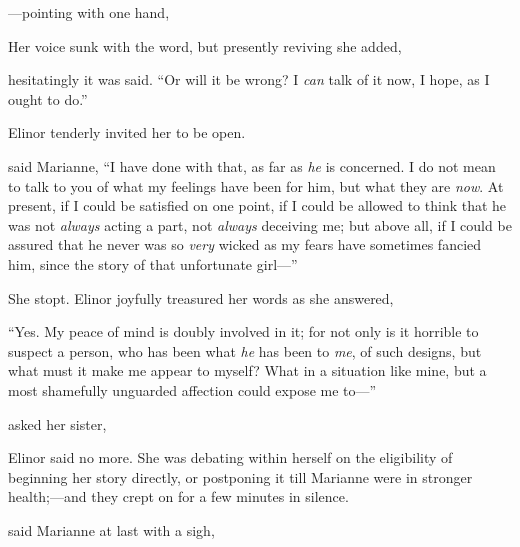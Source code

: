 ---pointing with one hand, 

Her voice sunk with the word, but presently reviving she added,

 hesitatingly it was said. “Or will it be wrong? I {\em can} talk of it now, I hope, as I ought to do.”

Elinor tenderly invited her to be open.

 said Marianne, “I have done with that, as far as {\em he} is concerned. I do not mean to talk to you of what my feelings have been for him, but what they are {\em now}. At present, if I could be satisfied on one point, if I could be allowed to think that he was not {\em always} acting a part, not {\em always} deceiving me; but above all, if I could be assured that he never was so {\em very} wicked as my fears have sometimes fancied him, since the story of that unfortunate girl---”

She stopt. Elinor joyfully treasured her words as she answered,


“Yes. My peace of mind is doubly involved in it; for not only is it horrible to suspect a person, who has been what {\em he} has been to {\em me}, of such designs, but what must it make me appear to myself? What in a situation like mine, but a most shamefully unguarded affection could expose me to---”

 asked her sister, 


Elinor said no more. She was debating within herself on the eligibility of beginning her story directly, or postponing it till Marianne were in stronger health;---and they crept on for a few minutes in silence.

 said Marianne at last with a sigh, 


